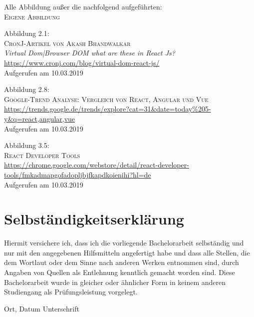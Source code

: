\documentclass[twoside,12pt,a4paper]{report}
\begin{document}
\begin{thebibliography}{9}
  Alle Abbildung außer die nachfolgend aufgeführten:\\
  \textsc{Eigene Abbildung}

  Abbildung 2.1:\\
  \textsc{CronJ-Artikel von Akash Bhandwalkar}\\
  \textit{Virtual Dom|Browser DOM what are these in React Js?}\\
  \href{https://www.cronj.com/blog/virtual-dom-react-js/}{https://www.cronj.com/blog/virtual-dom-react-js/}\\
  Aufgerufen am 10.03.2019

  Abbildung 2.8:\\
  \textsc{Google-Trend Analyse: Vergleich von React, Angular und Vue}\\
  \href{https://trends.google.de/trends/explore?cat=31&date=today%205-y&q=react,angular,vue}{https://trends.google.de/trends/explore?cat=31\&date=today\%205-y\&q=react,angular,vue}\\
  Aufgerufen am 10.03.2019

  Abbildung 3.5:\\
  \textsc{React Developer Tools}\\
  \href{https://chrome.google.com/webstore/detail/react-developer-tools/fmkadmapgofadopljbjfkapdkoienihi?hl=de}{https://chrome.google.com/webstore/detail/react-developer-tools/fmkadmapgofadopljbjfkapdkoienihi?hl=de}\\
  Aufgerufen am 10.03.2019


\end{thebibliography}



\clearpage

\thispagestyle{empty}
\section*{Selbst\"andigkeitserkl\"arung}

Hiermit versichere ich, dass ich die vorliegende Bachelorarbeit 
selbst\"andig und nur mit den angegebenen Hilfsmitteln angefertigt habe und dass alle Stellen, die dem Wortlaut oder dem 
Sinne nach anderen Werken entnommen sind, durch Angaben von Quellen als 
Entlehnung kenntlich gemacht worden sind. 
Diese Bachelorarbeit wurde in gleicher oder \"ahnlicher Form in keinem anderen 
Studiengang als Pr\"ufungsleistung vorgelegt. 

\vskip 3cm

Ort, Datum	\hfill Unterschrift \hfill 
\end{document}
